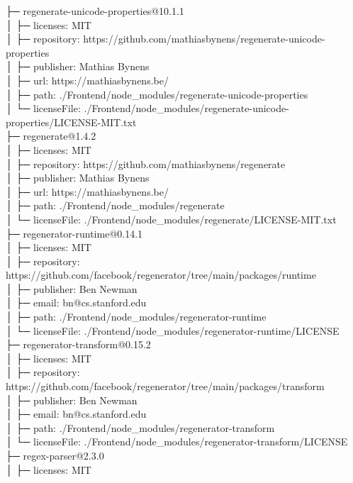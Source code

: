 ├─ regenerate-unicode-properties@10.1.1\\
│  ├─ licenses: MIT\\
│  ├─ repository: https://github.com/mathiasbynens/regenerate-unicode-properties\\
│  ├─ publisher: Mathias Bynens\\
│  ├─ url: https://mathiasbynens.be/\\
│  ├─ path: ./Frontend/node\_modules/regenerate-unicode-properties\\
│  └─ licenseFile: ./Frontend/node\_modules/regenerate-unicode-properties/LICENSE-MIT.txt\\
├─ regenerate@1.4.2\\
│  ├─ licenses: MIT\\
│  ├─ repository: https://github.com/mathiasbynens/regenerate\\
│  ├─ publisher: Mathias Bynens\\
│  ├─ url: https://mathiasbynens.be/\\
│  ├─ path: ./Frontend/node\_modules/regenerate\\
│  └─ licenseFile: ./Frontend/node\_modules/regenerate/LICENSE-MIT.txt\\
├─ regenerator-runtime@0.14.1\\
│  ├─ licenses: MIT\\
│  ├─ repository: https://github.com/facebook/regenerator/tree/main/packages/runtime\\
│  ├─ publisher: Ben Newman\\
│  ├─ email: bn@cs.stanford.edu\\
│  ├─ path: ./Frontend/node\_modules/regenerator-runtime\\
│  └─ licenseFile: ./Frontend/node\_modules/regenerator-runtime/LICENSE\\
├─ regenerator-transform@0.15.2\\
│  ├─ licenses: MIT\\
│  ├─ repository: https://github.com/facebook/regenerator/tree/main/packages/transform\\
│  ├─ publisher: Ben Newman\\
│  ├─ email: bn@cs.stanford.edu\\
│  ├─ path: ./Frontend/node\_modules/regenerator-transform\\
│  └─ licenseFile: ./Frontend/node\_modules/regenerator-transform/LICENSE\\
├─ regex-parser@2.3.0\\
│  ├─ licenses: MIT\\
